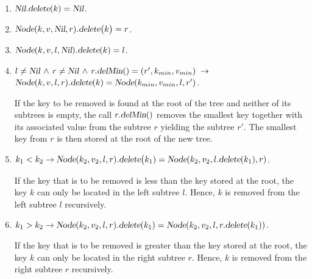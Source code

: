 \begin{enumerate}
\item $\textsl{Nil}.\textsl{delete}(k) = \textsl{Nil}$.
\item $\textsl{Node}(k,v,\textsl{Nil},r).\textsl{delete}\bigl(k\bigr) = r$.
\item $\textsl{Node}(k,v,l,\textsl{Nil}).\textsl{delete}(k) = l$.
\item $l \not= \textsl{Nil} \,\wedge\, r \not= \textsl{Nil} \,\wedge\, r.\textsl{delMin}() = (r',k_{min}, v_{min})  \;\rightarrow$ \\[0.2cm]
      \hspace*{1.3cm}
      $\textsl{Node}(k,v,l,r).\textsl{delete}(k) = \textsl{Node}(k_{min},v_{min},l,r')$.
      
      If the key to be removed is found at the root of the tree and neither of its subtrees is
      empty, the call  $r\mathtt{.}\textsl{delMin}()$ removes the smallest key together with its
      associated value from the subtree $r$ yielding the subtree $r'$.
      The smallest key from $r$ is then stored at the root of the new tree.

\item $k_1 < k_2 \rightarrow \textsl{Node}(k_2,v_2,l,r).\textsl{delete}\bigl(k_1) = 
       \textsl{Node}(k_2,v_2,l.\textsl{delete}(k_1),r)$.

       If the key that is to be removed is less than the key stored at the root, the key $k$ can only be
       located in the left subtree $l$.  Hence, $k$ is removed from the left subtree $l$ recursively.
\item $k_1 > k_2 \rightarrow \textsl{Node}(k_2,v_2,l,r).\textsl{delete}(k_1) = 
       \textsl{Node}(k_2,v_2,l,r.\textsl{delete}(k_1))$.

       If the key that is to be removed is greater than the key stored at the root, the key $k$ can only be
       located in the right subtree $r$.  Hence, $k$ is removed from the right subtree $r$ recursively.
\end{enumerate}

